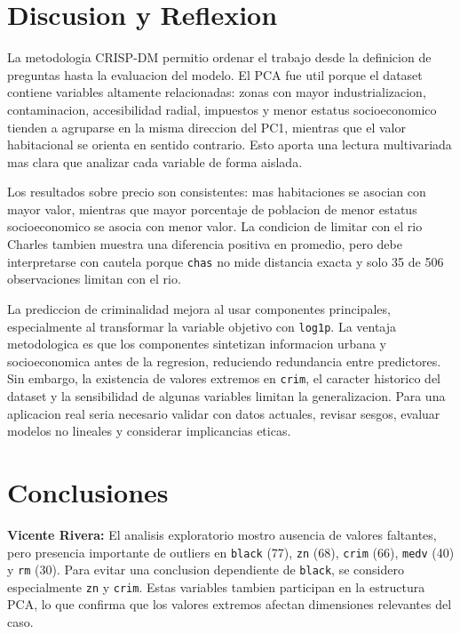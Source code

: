\documentclass[10pt,a4paper]{article}
\begin{document}
\section{Discusion y Reflexion}

La metodologia CRISP-DM permitio ordenar el trabajo desde la definicion de preguntas hasta la evaluacion del modelo. El PCA fue util porque el dataset contiene variables altamente relacionadas: zonas con mayor industrializacion, contaminacion, accesibilidad radial, impuestos y menor estatus socioeconomico tienden a agruparse en la misma direccion del PC1, mientras que el valor habitacional se orienta en sentido contrario. Esto aporta una lectura multivariada mas clara que analizar cada variable de forma aislada.

Los resultados sobre precio son consistentes: mas habitaciones se asocian con mayor valor, mientras que mayor porcentaje de poblacion de menor estatus socioeconomico se asocia con menor valor. La condicion de limitar con el rio Charles tambien muestra una diferencia positiva en promedio, pero debe interpretarse con cautela porque \texttt{chas} no mide distancia exacta y solo 35 de 506 observaciones limitan con el rio.

La prediccion de criminalidad mejora al usar componentes principales, especialmente al transformar la variable objetivo con \texttt{log1p}. La ventaja metodologica es que los componentes sintetizan informacion urbana y socioeconomica antes de la regresion, reduciendo redundancia entre predictores. Sin embargo, la existencia de valores extremos en \texttt{crim}, el caracter historico del dataset y la sensibilidad de algunas variables limitan la generalizacion. Para una aplicacion real seria necesario validar con datos actuales, revisar sesgos, evaluar modelos no lineales y considerar implicancias eticas.

\section{Conclusiones}

\textbf{Vicente Rivera:} El analisis exploratorio mostro ausencia de valores faltantes, pero presencia importante de outliers en \texttt{black} (77), \texttt{zn} (68), \texttt{crim} (66), \texttt{medv} (40) y \texttt{rm} (30). Para evitar una conclusion dependiente de \texttt{black}, se considero especialmente \texttt{zn} y \texttt{crim}. Estas variables tambien participan en la estructura PCA, lo que confirma que los valores extremos afectan dimensiones relevantes del caso.
\end{document}
